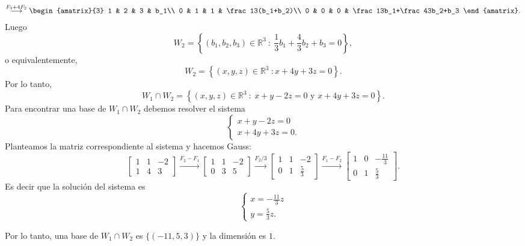\begin{enumerate}[resume, topsep=6pt, itemsep=.4cm]
\begin{align*}
        \stackrel{F_3+4F_2}{\longrightarrow}
        \begin{amatrix}{3}
            1 & 2 & 3 & b_1\\
            0 & 1 & 1 & \frac13(b_1+b_2)\\
            0 & 0 & 0 & \frac13b_1+\frac43b_2+b_3
        \end{amatrix}.
    \end{align*}
    Luego
    $$
    W_2 = \left\{ (b_1,b_2,b_3) \in \mathbb{R}^3 \ : \ \frac13b_1+\frac43b_2+b_3 = 0 \right\},
    $$
    o equivalentemente,
    $$
    W_2 = \left\{ (x,y,z) \in \mathbb{R}^3 \ : x +4y +3z =0\right\}.
    $$
    Por lo tanto, 
    $$
    W_1 \cap W_2 = \left\{ (x,y,z) \in \mathbb{R}^3 \ : \ x+y-2z=0 \text{ y } x +4y +3z =0\right\}.
    $$
    Para encontrar una base de $W_1 \cap W_2$ debemos resolver el sistema   
    $$
    \begin{cases}
        x+y-2z=0\\
        x +4y +3z =0.
    \end{cases}
    $$
    Planteamos la matriz correspondiente al sistema y hacemos Gauss:
    $$
    \begin{bmatrix}
        1 & 1 & -2\\
        1 & 4 & 3
    \end{bmatrix}
    \stackrel{F_2-F_1}{\longrightarrow}
    \begin{bmatrix}
        1 & 1 & -2\\
        0 & 3 & 5
    \end{bmatrix}
    \stackrel{F_2/3}{\longrightarrow}
    \begin{bmatrix}
        1 & 1 & -2\\
        0 & 1 & \frac53
    \end{bmatrix}
    \stackrel{F_1-F_2}{\longrightarrow}
    \begin{bmatrix}
        1 & 0 & -\frac{11}3\\
        0 & 1 & \frac53
    \end{bmatrix}.
    $$
    Es decir que la solución del sistema es
    $$
    \begin{cases}
        x = -\frac{11}3z\\
        y = \frac53z.
    \end{cases}
    $$

    Por lo tanto, una base de $W_1 \cap W_2$ es $\{(-11,5,3)\}$ y la dimensión es $1$.


\end{enumerate}
